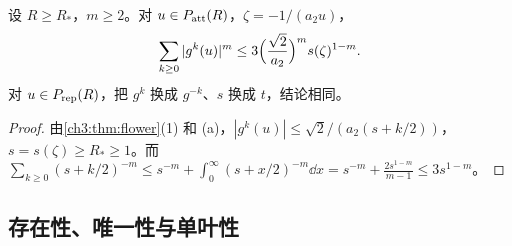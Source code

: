 \begin{lemma}[轨道求和]\label{ch3:lem:sum}
设 $R\ge R_*$，$m\ge2$。对 $u\in P_{\mathrm{att}}(R)$，$\zeta=-1/(a_2u)$，
\[
 \sum_{k\ge0}|g^k(u)|^m\le3\Bigl(\frac{\sqrt2}{a_2}\Bigr)^m s(\zeta)^{1-m}.
\]
对 $u\in P_{\mathrm{rep}}(R)$，把 $g^k$ 换成 $g^{-k}$、$s$ 换成 $t$，结论相同。
\end{lemma}

\begin{proof}
由\cref{ch3:thm:flower}(1) 和 (a)，$|g^k(u)|\le\sqrt2/(a_2(s+k/2))$，$s=s(\zeta)\ge R_*\ge1$。而
$\sum_{k\ge0}(s+k/2)^{-m}\le s^{-m}+\int_0^\infty(s+x/2)^{-m}\dd x=s^{-m}+\frac{2s^{1-m}}{m-1}\le3s^{1-m}$。
\end{proof}

\subsection{存在性、唯一性与单叶性}

